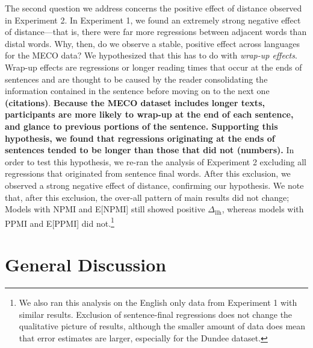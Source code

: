 \documentclass[12pt]{article}
\newcommand{\dllmath}{\Delta_{\mathrm{llh}}}
\newcommand{\dll}{$\dllmath$\xspace}
\begin{document}
The second question we address concerns the positive effect of distance observed in Experiment 2. In Experiment 1, we found an extremely strong negative effect of distance---that is, there were far more regressions between adjacent words than distal words. Why, then, do we observe a stable, positive effect across languages for the MECO data? We hypothesized that this has to do with \textit{wrap-up effects}. Wrap-up effects are regressions or longer reading times that occur at the ends of sentences and are thought to be caused by the reader consolidating the information contained in the sentence before moving on to the next one \textbf{(citations)}. \textbf{Because the MECO dataset includes longer texts, participants are more likely to wrap-up at the end of each sentence, and glance to previous portions of the sentence. Supporting this hypothesis, we found that regressions originating at the ends of sentences tended to be longer than those that did not (numbers).} In order to test this hypothesis, we re-ran the analysis of Experiment 2 excluding all regressions that originated from sentence final words. After this exclusion, we observed a strong negative effect of distance, confirming our hypothesis. We note that, after this exclusion, the over-all pattern of main results did not change; Models with NPMI and E[NPMI] still showed positive \dll, whereas models with PPMI and E[PPMI] did not.\footnote{We also ran this analysis on the English only data from Experiment 1 with similar results. Exclusion of sentence-final regressions does not change the qualitative picture of results, although the smaller amount of data does mean that error estimates are larger, especially for the Dundee dataset.}

\section{General Discussion}
\end{document}
